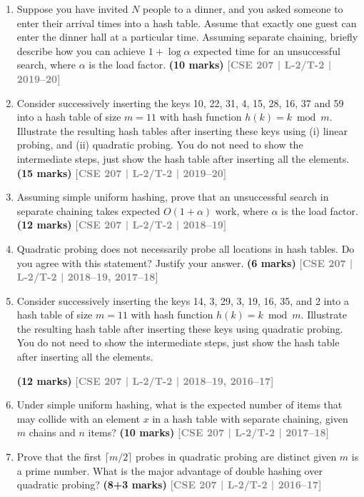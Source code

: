 \documentclass[12pt]{article}
\newcommand{\yr}[1]{\hfill\textcolor{gray}{\small\textbf{[#1]}}}
\newcommand{\mk}[1]{\textcolor{orange!70!black}{\small\textbf{(#1 marks)}}}
\begin{document}
\begin{enumerate}
\item Suppose you have invited $N$ people to a dinner, and you asked someone to enter their arrival times into a hash table. Assume that exactly one guest can enter the dinner hall at a particular time. Assuming separate chaining, briefly describe how you can achieve $1 + \log \alpha$ expected time for an unsuccessful search, where $\alpha$ is the load factor.
\mk{10} \yr{CSE 207 | L-2/T-2 | 2019--20}


\item Consider successively inserting the keys 10, 22, 31, 4, 15, 28, 16, 37 and 59 into a hash table of size $m = 11$ with hash function $h(k) = k \bmod m$. Illustrate the resulting hash tables after inserting these keys using (i) linear probing, and (ii) quadratic probing. You do not need to show the intermediate steps, just show the hash table after inserting all the elements.
\mk{15} \yr{CSE 207 | L-2/T-2 | 2019--20}


\item Assuming simple uniform hashing, prove that an unsuccessful search in separate chaining takes expected $O(1 + \alpha)$ work, where $\alpha$ is the load factor.
\mk{12} \yr{CSE 207 | L-2/T-2 | 2018--19}


\item Quadratic probing does not necessarily probe all locations in hash tables. Do you agree with this statement? Justify your answer.
\mk{6} \yr{CSE 207 | L-2/T-2 | 2018--19, 2017--18}


\item Consider successively inserting the keys 14, 3, 29, 3, 19, 16, 35, and 2 into a hash table of size $m = 11$ with hash function $h(k) = k \bmod m$. Illustrate the resulting hash table after inserting these keys using quadratic probing. You do not need to show the intermediate steps, just show the hash table after inserting all the elements.
 
\mk{12} \yr{CSE 207 | L-2/T-2 | 2018--19, 2016--17}



\item Under simple uniform hashing, what is the expected number of items that may collide with an element $x$ in a hash table with separate chaining, given $m$ chains and $n$ items? \mk{10}
\yr{CSE 207 | L-2/T-2 | 2017--18}


\item Prove that the first $\lceil m/2 \rceil$ probes in quadratic probing are distinct given $m$ is a prime number. What is the major advantage of double hashing over quadratic probing? \mk{8+3}
\yr{CSE 207 | L-2/T-2 | 2016--17}



\end{enumerate}
\end{document}
